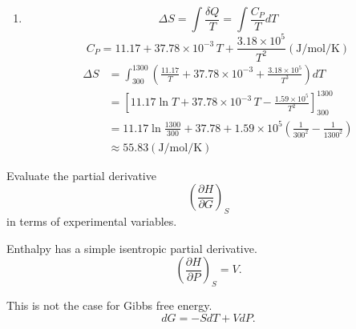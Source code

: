 \begin{@empty}
\begin{answer}
    \begin{enumerate}
        \item \[ \Delta S = \int \frac{\delta Q}{T} = \int \frac{C_P}{T} dT \]
            \[ C_P = 11.17 + 37.78 \times 10^{-3}\, T + \frac{3.18 \times 10^5}{T^2} \left( \si{\joule\per\mol\per\kelvin} \right) \]
            \begin{align*}
                \Delta S &= \int_{300}^{1300} \left( \frac{11.17}{T} + 37.78 \times 10^{-3} + \frac{3.18 \times 10^5}{T^3} \right) dT \\
                    &= \left[ 11.17 \ln T + 37.78 \times 10^{-3}\, T - \frac{1.59 \times 10^5}{T^2} \right]_{300}^{1300} \\
                    &= 11.17 \ln \frac{1300}{300} + 37.78
                        + 1.59 \times 10^5 \left( \frac{1}{300^2} - \frac{1}{1300^2} \right) \\
                    &\approx 55.83 \left( \si{\joule\per\mol\per\kelvin} \right)
            \end{align*}
    \end{enumerate}
\end{answer}

\begin{problem}
\end{problem}

\begin{problem}
\end{problem}

\begin{problem}
\end{problem}

\begin{problem}
\end{problem}

\begin{problem}
    Evaluate the partial derivative
    \[ \left( \frac{\partial H}{\partial G} \right)_S \]
    in terms of experimental variables.
\end{problem}

\begin{answer}
    Enthalpy has a simple isentropic partial derivative.
    \begin{equation}
       \left( \frac{\partial H}{\partial P} \right)_S = V. \label{eq:HPS}
    \end{equation}

    This is not the case for Gibbs free energy.
    \begin{equation}
        dG = -SdT + VdP. \label{eq:dG}
    \end{equation}


\end{answer}
\end{@empty}
